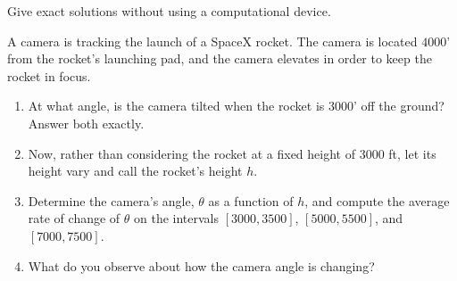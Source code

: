 \documentclass{ximera}
\author{Elizabeth Campolongo}
\begin{document}
\begin{exercise}

Give exact solutions without using a computational device.%

A camera is tracking the launch of a SpaceX rocket. The camera is located $4000$' from the rocket's launching pad, and the camera elevates in order to keep the rocket in focus. 
\begin{enumerate}
\item At what angle, is the camera tilted when the rocket is $3000$' off the ground? Answer both exactly.%
\par
\item[] Now, rather than considering the rocket at a fixed height of $3000$ ft, let its height vary and call the rocket's height $h$. 

\item Determine the camera's angle, $\theta$ as a function of $h$, and compute the average rate of change of $\theta$ on the intervals $[3000,3500]$, $[5000,5500]$, and $[7000,7500]$. 

\item What do you observe about how the camera angle is changing?%
\end{enumerate}
\end{exercise}
\end{document}
